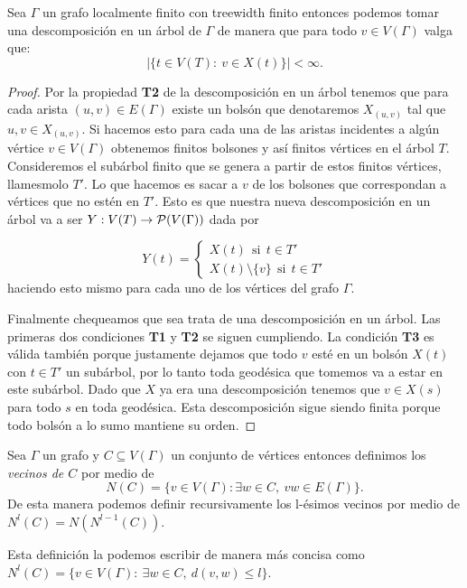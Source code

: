 \documentclass[tesis.tex]{subfiles}
\begin{document}
\begin{prop}\label{prop_tw_finitos_bolsones}
	Sea $\Gamma$ un grafo localmente finito con treewidth finito entonces podemos tomar una descomposición en un árbol de $\Gamma$ de manera que para todo $v \in V(\Gamma)$ valga que:
	\[
	| \{  t \in V(T) : \ v \in X(t)  \} | < \infty.
	\]
\end{prop}
\begin{proof}
	Por la propiedad \textbf{T2} de la descomposición en un árbol tenemos que para cada arista $(u,v) \in E(\Gamma)$ existe un bolsón que denotaremos $X_{(u,v)}$ tal que $u,v \in X_{(u,v)}$.
	Si hacemos esto para cada una de las aristas incidentes a algún vértice $v \in V(\Gamma)$ obtenemos finitos bolsones y así finitos vértices en el árbol $T$.
	Consideremos el subárbol finito que se genera a partir de estos finitos vértices, llamesmolo $T'$.
	Lo que hacemos es sacar a $v$ de los bolsones que correspondan a vértices que no estén en $T'$.
	Esto es que nuestra nueva descomposición en un árbol va a ser $Y: V(T) \to {\cal P}(V(\Gamma))$ dada por 
	
	\[
	Y(t) = 
	\begin{cases}
		X(t)  \ \  \text{si} \ \  t \in T' \\
		X(t) \setminus \{  v \} \ \  \text{si} \ \  t \in T'
	\end{cases}
	\]
	haciendo esto mismo para cada uno de los vértices del grafo $\Gamma$.
	
	Finalmente chequeamos que sea trata de una descomposición en un árbol.
	Las primeras dos condiciones \textbf{T1} y \textbf{T2} se siguen cumpliendo.
	La condición \textbf{T3} es válida también porque justamente dejamos que todo $v$ esté en un bolsón $ X(t)$ con $t \in T'$ un subárbol, por lo tanto toda geodésica que tomemos va a estar en este subárbol.
	Dado que $X$ ya era una descomposición tenemos que $v \in X(s)$ para todo $s$ en toda geodésica.
	Esta descomposición sigue siendo finita porque todo bolsón a lo sumo mantiene su orden.	
\end{proof}

\begin{deff}
	Sea $\Gamma$ un grafo y $C \subseteq V(\Gamma)$ un conjunto de vértices entonces definimos los \emph{vecinos de $C$} por medio de 
	\[
	N(C) = \{ v \in V(\Gamma) : \exists w \in C, \ vw \in E(\Gamma) \}.
	\]
	De esta manera podemos definir recursivamente los l-ésimos vecinos por medio de $N^l(C) = N(N^{l-1}(C))$.
\end{deff}

\begin{obs}
	Esta definición la podemos escribir de manera más concisa como $N^l (C) = \{ v \in V(\Gamma) : \ \exists w \in C, \  d(v,w) \le l  \}$.
\end{obs}
\end{document}
